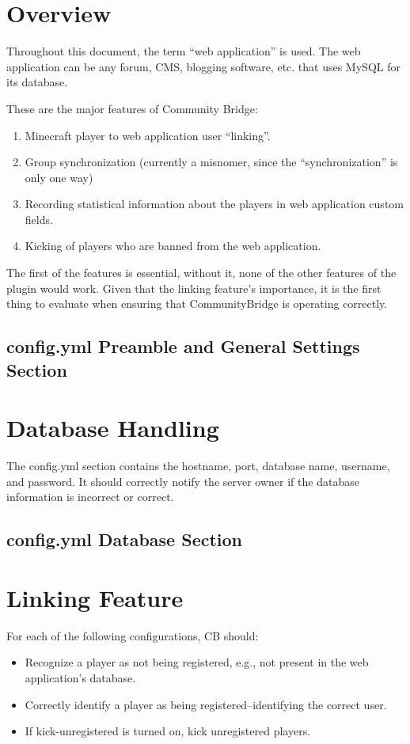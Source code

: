 \documentclass[letterpaper,12pt]{article}
\begin{document}
  \section{Overview}
  Throughout this document, the term ``web application'' is used. The web
  application can be any forum, CMS, blogging software, etc. that uses MySQL for
  its database.
  
  These are the major features of Community Bridge:
  \begin{enumerate}
    \item Minecraft player to web application user ``linking''.
    \item Group synchronization (currently a misnomer, since the
          ``synchronization'' is only one way)
    \item Recording statistical information about the players in web
          application custom fields.
    \item Kicking of players who are banned from the web application.
  \end{enumerate}
  
  The first of the features is essential, without it, none of the other
  features of the plugin would work. Given that the linking feature's
  importance, it is the first thing to evaluate when ensuring that
  CommunityBridge is operating correctly.

  \clearpage
  \subsection{config.yml Preamble and General Settings Section}
  

  \clearpage
  \section{Database Handling}
  The config.yml section contains the hostname, port, database name, username,
  and password. It should correctly notify the server owner if the database
  information is incorrect or correct.
  
  \clearpage
  \subsection{config.yml Database Section}
  

  \clearpage
  \section{Linking Feature}
  For each of the following configurations, CB should:
  \begin{itemize}
    \item Recognize a player as not being registered, e.g., not present in the
    web application's database.
    \item Correctly identify a player as being registered--identifying the
    correct user.
    \item If kick-unregistered is turned on, kick unregistered players.
  \end{itemize}
\end{document}
